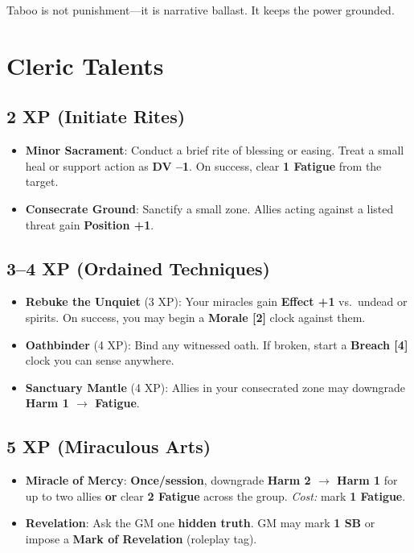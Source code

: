 \documentclass[11pt]{book}
\begin{document}
Taboo is not punishment---it is narrative ballast. It keeps the power grounded.

\section{Cleric Talents}

\subsection*{2 XP (Initiate Rites)}
\begin{itemize}
  \item \textbf{Minor Sacrament}: Conduct a brief rite of blessing or easing.  
        Treat a small heal or support action as \textbf{DV --1}.  
        On success, clear \textbf{1 Fatigue} from the target.
  \item \textbf{Consecrate Ground}: Sanctify a small zone.  
        Allies acting against a listed threat gain \textbf{Position +1}.
\end{itemize}

\subsection*{3--4 XP (Ordained Techniques)}
\begin{itemize}
  \item \textbf{Rebuke the Unquiet} (3 XP):  
    Your miracles gain \textbf{Effect +1} vs.\ undead or spirits.  
    On success, you may begin a \textbf{Morale [2]} clock against them.
  \item \textbf{Oathbinder} (4 XP):  
    Bind any witnessed oath.  
    If broken, start a \textbf{Breach [4]} clock you can sense anywhere.
  \item \textbf{Sanctuary Mantle} (4 XP):  
    Allies in your consecrated zone may downgrade \textbf{Harm 1 $\rightarrow$ Fatigue}.
\end{itemize}

\subsection*{5 XP (Miraculous Arts)}
\begin{itemize}
  \item \textbf{Miracle of Mercy}:  
    \textbf{Once/session}, downgrade \textbf{Harm 2 $\rightarrow$ Harm 1} for up to two allies  
    \textbf{or} clear \textbf{2 Fatigue} across the group.  
    \emph{Cost:} mark \textbf{1 Fatigue}.
  \item \textbf{Revelation}:  
    Ask the GM one \textbf{hidden truth}.  
    GM may mark \textbf{1 SB} or impose a \textbf{Mark of Revelation} (roleplay tag).
\end{itemize}
\end{document}
